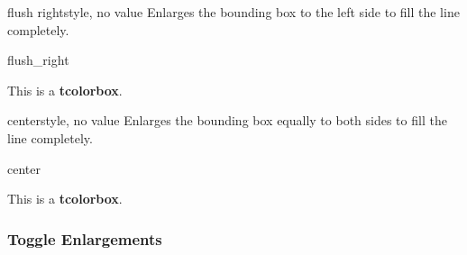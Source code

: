 \begin{docTcbKey}[][doc new=2015-11-20]{flush right}{}{style, no value}
  Enlarges the bounding box to the left side to fill the line completely.
\begin{exdispExample}{flush_right}

\begin{tcolorbox}[flush right,width=5cm,enhanced,show bounding box]
This is a \textbf{tcolorbox}.
\end{tcolorbox}
\end{exdispExample}
\end{docTcbKey}


\begin{docTcbKey}[][doc new=2015-11-20]{center}{}{style, no value}
  Enlarges the bounding box equally to both sides to fill the line completely.
\begin{exdispExample}{center}

\begin{tcolorbox}[center,width=5cm,enhanced,show bounding box]
This is a \textbf{tcolorbox}.
\end{tcolorbox}
\end{exdispExample}
\end{docTcbKey}


\clearpage
\subsubsection{Toggle Enlargements}

